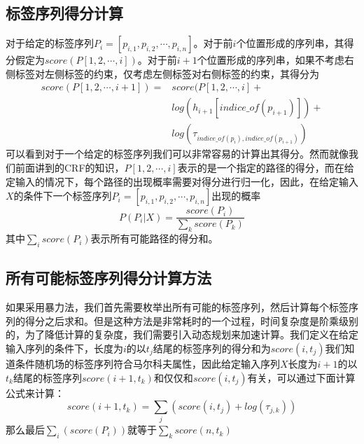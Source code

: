 \documentclass[twoside,a4paper,12pt]{book}%
\begin{document}
\subsection{标签序列得分计算}
对于给定的标签序列$P_i=[p_{i,1},p_{i,2},\cdots,p_{i,n}]$。对于前$i$个位置形成的序列串，其得分假定为$score(P[1,2,\cdots,i])$。对于前$i+1$个位置形成的序列串，如果不考虑右侧标签对左侧标签的约束，仅考虑左侧标签对右侧标签的约束，其得分为
$$
\begin{aligned}
score(P[1,2,\cdots,i+1])=
& score(P[1,2,\cdots,i] + \\
& log(h_{i+1}[indice\_of(p_{i+1})]) + \\ 
& log(\tau_{indice\_of(p_{i}),indice\_of(p_{i+1})})
\end{aligned}
$$
可以看到对于一个给定的标签序列我们可以非常容易的计算出其得分。然而就像我们前面讲到的\gls{CRF}的知识，$P[1,2,\cdots,i]$表示的是一个指定的路径的得分，而在给定输入的情况下，每个路径的出现概率需要对得分进行归一化，因此，在给定输入$X$的条件下一个标签序列$P_i=[p_{i,1},p_{i,2},\cdots,p_{i,n}]$出现的概率
$$
P(P_i|X) = \frac{score(P_i)}{\sum_k{score(P_k)}}
$$
其中$\sum_i{score(P_i)}$表示所有可能路径的得分和。

\subsection{所有可能标签序列得分计算方法}
如果采用暴力法，我们首先需要枚举出所有可能的标签序列，然后计算每个标签序列的得分之后求和。但是这种方法是非常耗时的一个过程，时间复杂度是阶乘级别的，为了降低计算的复杂度，我们需要引入动态规划来加速计算。我们定义在给定输入序列的条件下，长度为$i$的以$t_j$结尾的标签序列的得分和为$score(i,t_j)$我们知道条件随机场的标签序列符合马尔科夫属性，因此给定输入序列$X$长度为$i+1$的以$t_k$结尾的标签序列$score(i+1,t_k)$和仅仅和$score(i,t_j)$有关，可以通过下面计算公式来计算：
$$
score(i+1,t_k) = \sum_{j} {(score(i,t_j) + log(\tau_{j,k}))}
$$
那么最后$\sum_i(score(P_i))$就等于$\sum_{k}score(n,t_k)$
\end{document}
